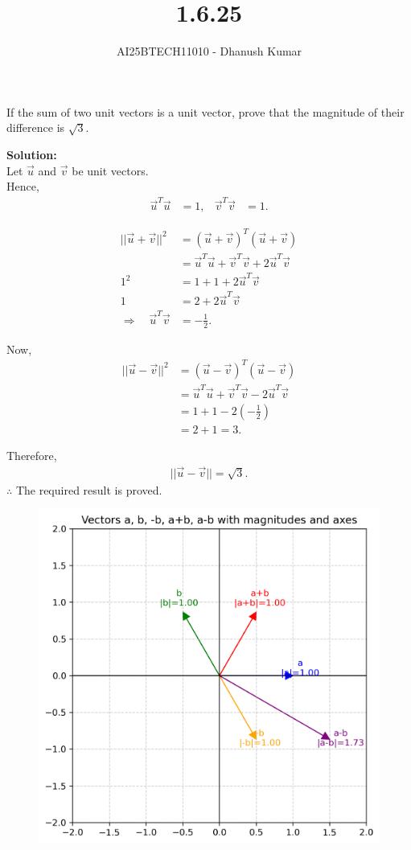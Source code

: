 \documentclass[journal]{IEEEtran}
\begin{document}
\title{1.6.25}
\author{AI25BTECH11010 - Dhanush Kumar}
\maketitle
\renewcommand{\thefigure}{\theenumi}
\renewcommand{\thetable}{\theenumi}

\noindent

If the sum of two unit vectors is a unit vector, prove that the magnitude of their difference is $\sqrt{3}$.

\bigskip
\noindent\textbf{Solution:} \\


Let 
	$\vec{u}$ and $\vec{v}$ be unit vectors.\\
	Hence,
\begin{align}
	\vec{u}^T \vec{u} &= 1, & \vec{v}^T \vec{v} &= 1.
\end{align}

\medskip

\begin{align}
||\vec{u}+\vec{v}||^2 &= (\vec{u}+\vec{v})^T(\vec{u}+\vec{v}) \\
&= \vec{u}^T\vec{u} + \vec{v}^T\vec{v} + 2\vec{u}^T\vec{v} \\
1^2 &= 1 + 1 + 2\vec{u}^T\vec{v} \\
1 &= 2 + 2\vec{u}^T\vec{v} \\
\Rightarrow \quad \vec{u}^T\vec{v} &= -\tfrac{1}{2}.
\end{align}

\medskip

Now,  
\begin{align}
||\vec{u}-\vec{v}||^2 &= (\vec{u}-\vec{v})^T(\vec{u}-\vec{v}) \\
&= \vec{u}^T\vec{u} + \vec{v}^T\vec{v} - 2\vec{u}^T\vec{v} \\
&= 1 + 1 - 2\left(-\tfrac{1}{2}\right) \\
&= 2 + 1 = 3.
\end{align}

Therefore,  
\begin{align}
||\vec{u}-\vec{v}|| = \sqrt{3}.
\end{align}
\noindent\(\therefore\) The required result is proved.
\begin{figure}[H]
  \centering
   \includegraphics[width=0.7\linewidth]{../figs/vectors_plot.png}
   \caption{}
  \label{stemplot}
\end{figure}
\end{document}
